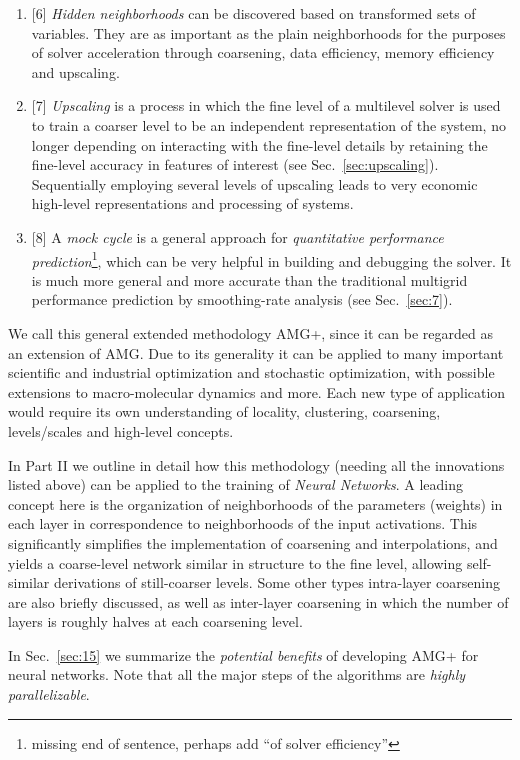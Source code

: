 \documentclass{article} %
\begin{document}
\begin{enumerate}
    \item{[6]} {\it Hidden neighborhoods} can be discovered based on transformed sets of variables. They are as important as the plain neighborhoods for the purposes of solver acceleration through coarsening, data efficiency, memory efficiency and upscaling. 
    \item{[7]} {\it Upscaling} is a process in which the fine level of a multilevel solver is used to train a coarser level to be an independent representation of the system, no longer depending on interacting with the fine-level details by retaining the fine-level accuracy in features of interest (see Sec.~\ref{sec:upscaling}). Sequentially employing several levels of upscaling leads to very economic high-level representations and processing of systems.
    \item{[8]} A {\it mock cycle} is a general approach for {\it quantitative performance prediction}\footnote{missing end of sentence, perhaps add ``of solver efficiency''}, which can be very helpful in building and debugging the solver. It is much more general and more accurate than the traditional multigrid performance prediction by smoothing-rate analysis (see Sec.~\ref{sec:7}). 
\end{enumerate}
We call this general extended methodology AMG+, since it can be regarded as an extension of AMG. Due to its generality it can be applied to many important scientific and industrial optimization and stochastic optimization, with possible extensions to macro-molecular dynamics and more. Each new type of application would require its own understanding of locality, clustering, coarsening, levels/scales and high-level concepts.

In Part II we outline in detail how this methodology (needing all the innovations listed above) can be applied to the training of {\it Neural Networks}. A leading concept here is the organization of neighborhoods of the parameters (weights) in each layer in correspondence to neighborhoods of the input activations. This significantly simplifies the implementation of coarsening and interpolations, and yields a coarse-level network similar in structure to the fine level, allowing self-similar derivations of still-coarser levels. Some other types intra-layer coarsening are also briefly discussed, as well as inter-layer coarsening in which the number of layers is roughly halves at each coarsening level.

In Sec.~\ref{sec:15} we summarize the {\it potential benefits} of developing AMG+ for neural networks. Note that all the major steps of the algorithms are {\it highly parallelizable}.
\end{document}
